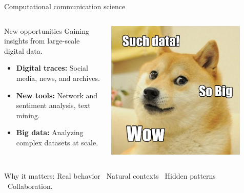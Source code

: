 \documentclass[handout]{beamer}
\begin{document}
\begin{frame}{Computational communication science}

    \begin{columns}[T]
        \begin{column}{0.6\textwidth}
            \begin{block}{New opportunities}
                Gaining insights from large-scale digital data.
            \end{block}

            \vspace{0.2cm}
            \begin{itemize}
                \item \textbf{Digital traces:} Social media, news, and archives.
                \item \textbf{New tools:} Network and sentiment analysis, text mining.
                \item \textbf{Big data:} Analyzing complex datasets at scale.
            \end{itemize}
        \end{column}

        \begin{column}{0.4\textwidth}
            \includegraphics[width=0.85\textwidth]{../pictures/doge-big-data-meme.jpg}
        \end{column}
    \end{columns}

    \vspace{0.3cm}
    \begin{block}{Why it matters:}
        Real behavior \textbullet\ Natural contexts \textbullet\ Hidden patterns \textbullet\ Collaboration.
    \end{block}

\end{frame}
\end{document}

